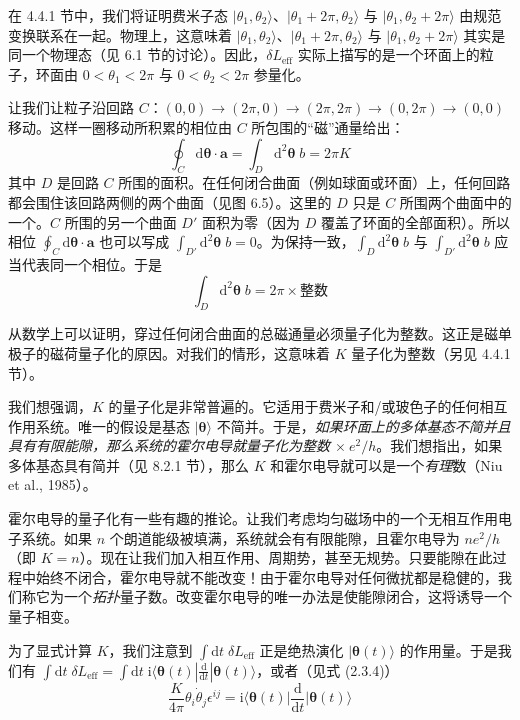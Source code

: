 在 4.4.1 节中，我们将证明费米子态 $|\theta_{1}, \theta_{2}\rangle$、$|\theta_{1} + 2\pi, \theta_{2}\rangle$ 与 $|\theta_{1}, \theta_{2} + 2\pi\rangle$ 由规范变换联系在一起。物理上，这意味着 $|\theta_{1}, \theta_{2}\rangle$、$|\theta_{1} + 2\pi, \theta_{2}\rangle$ 与 $|\theta_{1}, \theta_{2} + 2\pi\rangle$ 其实是同一个物理态（见 6.1 节的讨论）。因此，$\delta L_{\mathrm{eff}}$ 实际上描写的是一个环面上的粒子，环面由 $0 < \theta_{1} < 2\pi$ 与 $0 < \theta_{2} < 2\pi$ 参量化。

让我们让粒子沿回路 $C$：$(0,0) \to (2\pi,0) \to (2\pi,2\pi) \to (0,2\pi) \to (0,0)$ 移动。这样一圈移动所积累的相位由 $C$ 所包围的``磁''通量给出：
\begin{equation*}
\oint_{C} \mathrm{d}\pmb{\theta} \cdot \pmb{a} = \int_{D} \mathrm{d}^{2}\pmb{\theta}\; b = 2\pi K
\end{equation*}
其中 $D$ 是回路 $C$ 所围的面积。在任何闭合曲面（例如球面或环面）上，任何回路都会围住该回路两侧的两个曲面（见图 6.5）。这里的 $D$ 只是 $C$ 所围两个曲面中的一个。$C$ 所围的另一个曲面 $D'$ 面积为零（因为 $D$ 覆盖了环面的全部面积）。所以相位 $\oint_{C} \mathrm{d}\pmb{\theta} \cdot \pmb{a}$ 也可以写成 $\int_{D'} \mathrm{d}^{2}\pmb{\theta}\; b = 0$。为保持一致，$\int_{D} \mathrm{d}^{2}\pmb{\theta}\; b$ 与 $\int_{D'} \mathrm{d}^{2}\pmb{\theta}\; b$ 应当代表同一个相位。于是
\begin{equation*}
\int_{D} \mathrm{d}^{2}\pmb{\theta}\; b = 2\pi \times \text{整数}
\end{equation*}

从数学上可以证明，穿过任何闭合曲面的总磁通量必须量子化为整数。这正是磁单极子的磁荷量子化的原因。对我们的情形，这意味着 $K$ 量子化为整数（另见 4.4.1 节）。

我们想强调，$K$ 的量子化是非常普遍的。它适用于费米子和/或玻色子的任何相互作用系统。唯一的假设是基态 $|\pmb{\theta}\rangle$ 不简并。于是，\emph{如果环面上的多体基态不简并且具有有限能隙，那么系统的霍尔电导就量子化为整数 $\times\ e^{2}/h$}。我们想指出，如果多体基态具有简并（见 8.2.1 节），那么 $K$ 和霍尔电导就可以是一个\emph{有理}数（Niu et al., 1985）。

霍尔电导的量子化有一些有趣的推论。让我们考虑均匀磁场中的一个无相互作用电子系统。如果 $n$ 个朗道能级被填满，系统就会有有限能隙，且霍尔电导为 $ne^{2}/h$（即 $K = n$）。现在让我们加入相互作用、周期势，甚至无规势。只要能隙在此过程中始终不闭合，霍尔电导就不能改变！由于霍尔电导对任何微扰都是稳健的，我们称它为一个\emph{拓扑}量子数。改变霍尔电导的唯一办法是使能隙闭合，这将诱导一个量子相变。

为了显式计算 $K$，我们注意到 $\int \mathrm{d}t\; \delta L_{\mathrm{eff}}$ 正是绝热演化 $|\pmb{\theta}(t)\rangle$ 的作用量。于是我们有 $\int \mathrm{d}t\; \delta L_{\mathrm{eff}} = \int \mathrm{d}t\; \mathrm{i}\langle \pmb{\theta}(t) | \frac{\mathrm{d}}{\mathrm{d}t} | \pmb{\theta}(t) \rangle$，或者（见式 (2.3.4)）
\begin{equation*}
\frac{K}{4\pi} \theta_{i} \dot{\theta}_{j} \epsilon^{ij} = \mathrm{i} \Big\langle \pmb{\theta}(t) \Big| \frac{\mathrm{d}}{\mathrm{d}t} \Big| \pmb{\theta}(t) \Big\rangle \tag{4.4.2}
\end{equation*}

